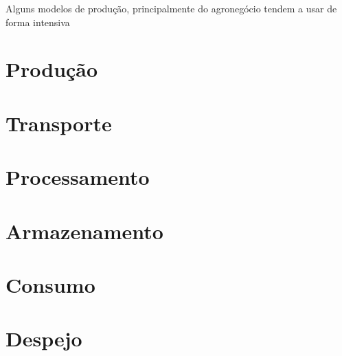 \documentclass[]{article}
\begin{document}
Alguns modelos de produção, principalmente do agronegócio tendem a usar de forma intensiva 

\section{Produção}



\section{Transporte}

\section{Processamento}

\section{Armazenamento}

\section{Consumo}

\section{Despejo}
\end{document}
